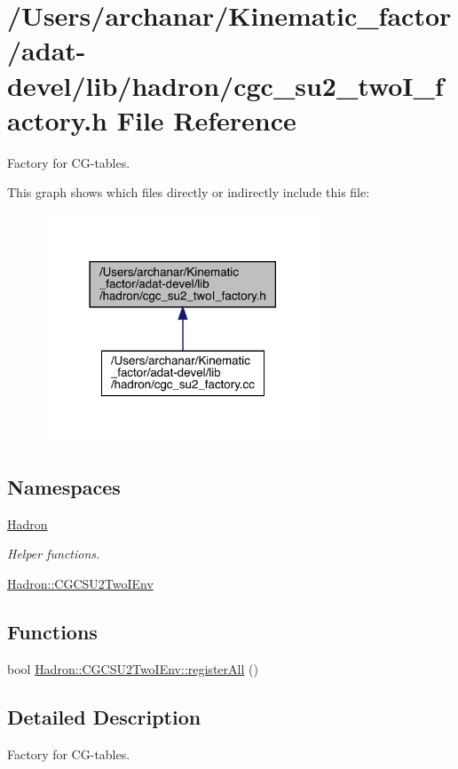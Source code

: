 \hypertarget{adat-devel_2lib_2hadron_2cgc__su2__twoI__factory_8h}{}\section{/\+Users/archanar/\+Kinematic\+\_\+factor/adat-\/devel/lib/hadron/cgc\+\_\+su2\+\_\+two\+I\+\_\+factory.h File Reference}
\label{adat-devel_2lib_2hadron_2cgc__su2__twoI__factory_8h}


Factory for C\+G-\/tables.  


This graph shows which files directly or indirectly include this file\+:
\nopagebreak
\begin{figure}[H]
\begin{center}
\leavevmode
\includegraphics[width=237pt]{d8/dfe/adat-devel_2lib_2hadron_2cgc__su2__twoI__factory_8h__dep__incl}
\end{center}
\end{figure}
\subsection*{Namespaces}
\begin{DoxyCompactItemize}
\item 
 \mbox{\hyperlink{namespaceHadron}{Hadron}}
\begin{DoxyCompactList}\small\item\em Helper functions. \end{DoxyCompactList}\item 
 \mbox{\hyperlink{namespaceHadron_1_1CGCSU2TwoIEnv}{Hadron\+::\+C\+G\+C\+S\+U2\+Two\+I\+Env}}
\end{DoxyCompactItemize}
\subsection*{Functions}
\begin{DoxyCompactItemize}
\item 
bool \mbox{\hyperlink{namespaceHadron_1_1CGCSU2TwoIEnv_aed4e8b3bb2141bf8176b9a6be35b2406}{Hadron\+::\+C\+G\+C\+S\+U2\+Two\+I\+Env\+::register\+All}} ()
\end{DoxyCompactItemize}


\subsection{Detailed Description}
Factory for C\+G-\/tables. 

